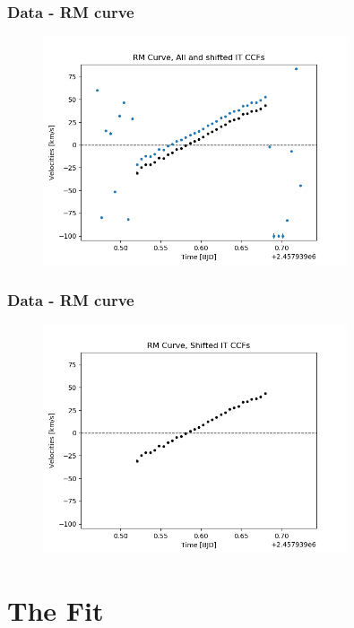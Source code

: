 \documentclass[show notes]{beamer}
\begin{document}
\begin{frame}
\frametitle{Data - RM curve}
\begin{figure}
	\centering
	\includegraphics[width=0.8\textwidth]{../figures/RM_all_shift.png}
	\label{fig:RM_all_shift}
\end{figure}
\end{frame}

\begin{frame}
\frametitle{Data - RM curve}
\begin{figure}
	\centering
	\includegraphics[width=0.8\textwidth]{../figures/RM_shift.png}
	\label{fig:RM_shift}
\end{figure}
\end{frame}

\section{The Fit}
\end{document}
